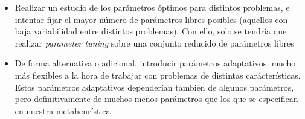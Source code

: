 \documentclass[11pt]{article}
\begin{document}
\begin{itemize}
    \item Realizar un estudio de los parámetros óptimos para distintos problemas, e intentar fijar el mayor número de parámetros libres posibles (aquellos con baja variabilidad entre distintos problemas). Con ello, solo se tendría que realizar \emph{parameter tuning} sobre una conjunto reducido de parámetros libres
    \item De forma alternativa o adicional, introducir parámetros adaptativos, mucho más flexibles a la hora de trabajar con problemas de distintas carácterísticas. Estos parámetros adaptativos dependerían también de algunos parámetros, pero definitivamente de muchos menos parámetros que los que se especifican en nuestra metaheurística
\end{itemize}


\pagebreak



\end{document}
